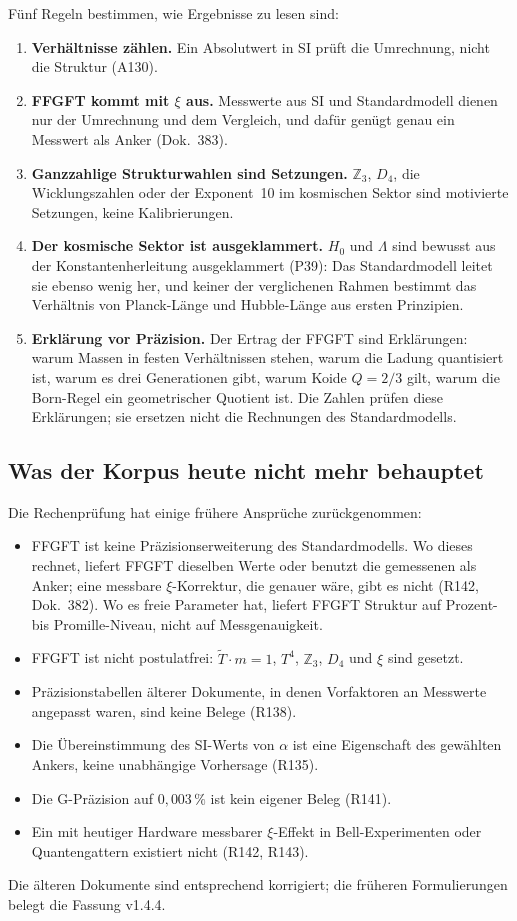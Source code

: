 Fünf Regeln bestimmen, wie Ergebnisse zu lesen sind:
\begin{enumerate}[leftmargin=*,itemsep=2pt]
\item \textbf{Verhältnisse zählen.} Ein Absolutwert in SI prüft die Umrechnung, nicht die
  Struktur (A130).
\item \textbf{FFGFT kommt mit $\xi$ aus.} Messwerte aus SI und Standardmodell dienen nur der
  Umrechnung und dem Vergleich, und dafür genügt genau ein Messwert als Anker (Dok.~383).
\item \textbf{Ganzzahlige Strukturwahlen sind Setzungen.} $\mathbb{Z}_3$, $D_4$, die
  Wicklungszahlen oder der Exponent~10 im kosmischen Sektor sind motivierte Setzungen, keine
  Kalibrierungen.
\item \textbf{Der kosmische Sektor ist ausgeklammert.} $H_0$ und $\Lambda$ sind bewusst aus der
  Konstantenherleitung ausgeklammert (P39): Das Standardmodell leitet sie ebenso wenig her, und
  keiner der verglichenen Rahmen bestimmt das Verhältnis von Planck-Länge und Hubble-Länge aus
  ersten Prinzipien.
\item \textbf{Erklärung vor Präzision.} Der Ertrag der FFGFT sind Erklärungen: warum Massen in
  festen Verhältnissen stehen, warum die Ladung quantisiert ist, warum es drei Generationen gibt,
  warum Koide $Q=2/3$ gilt, warum die Born-Regel ein geometrischer Quotient ist. Die Zahlen prüfen
  diese Erklärungen; sie ersetzen nicht die Rechnungen des Standardmodells.
\end{enumerate}

\subsection{Was der Korpus heute nicht mehr behauptet}

Die Rechenprüfung hat einige frühere Ansprüche zurückgenommen:
\begin{itemize}[leftmargin=*,itemsep=1pt]
\item FFGFT ist keine Präzisionserweiterung des Standardmodells. Wo dieses rechnet, liefert FFGFT
  dieselben Werte oder benutzt die gemessenen als Anker; eine messbare $\xi$-Korrektur, die genauer
  wäre, gibt es nicht (R142, Dok.~382). Wo es freie Parameter hat, liefert FFGFT Struktur auf
  Prozent- bis Promille-Niveau, nicht auf Messgenauigkeit.
\item FFGFT ist nicht \glqq postulatfrei\grqq: $\tilde T\cdot m=1$, $T^4$, $\mathbb{Z}_3$, $D_4$
  und $\xi$ sind gesetzt.
\item Präzisionstabellen älterer Dokumente, in denen Vorfaktoren an Messwerte angepasst waren,
  sind keine Belege (R138).
\item Die Übereinstimmung des SI-Werts von $\alpha$ ist eine Eigenschaft des gewählten Ankers,
  keine unabhängige Vorhersage (R135).
\item Die G-Präzision auf $0{,}003\,\%$ ist kein eigener Beleg (R141).
\item Ein mit heutiger Hardware messbarer $\xi$-Effekt in Bell-Experimenten oder Quantengattern
  existiert nicht (R142, R143).
\end{itemize}
Die älteren Dokumente sind entsprechend korrigiert; die früheren Formulierungen belegt die Fassung v1.4.4.


